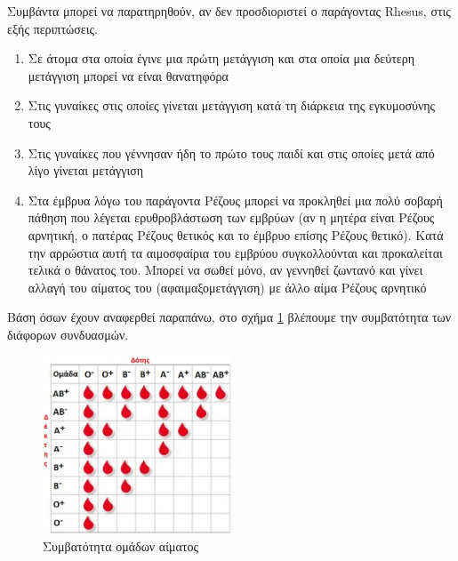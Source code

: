 Συμβάντα μπορεί να παρατηρηθούν, αν δεν προσδιοριστεί ο παράγοντας Rhesus, στις εξής
περιπτώσεις.
\begin{enumerate}
	\item Σε άτομα στα οποία έγινε μια πρώτη μετάγγιση και στα οποία μια δεύτερη μετάγγιση μπορεί να είναι θανατηφόρα
	\item Στις γυναίκες στις οποίες γίνεται μετάγγιση κατά τη διάρκεια της εγκυμοσύνης τους
	\item Στις γυναίκες που γέννησαν ήδη το πρώτο τους παιδί και στις οποίες μετά από λίγο γίνεται μετάγγιση
	\item Στα έμβρυα λόγω του παράγοντα Ρέζους μπορεί να προκληθεί μια πολύ σοβαρή πάθηση που λέγεται ερυθροβλάστωση των εμβρύων (αν η μητέρα είναι Ρέζους αρνητική, ο πατέρας Ρέζους θετικός και το έμβρυο επίσης Ρέζους θετικό). Κατά την αρρώστια αυτή τα αιμοσφαίρια του εμβρύου συγκολλούνται και προκαλείται τελικά ο θάνατος του. Μπορεί να σωθεί μόνο, αν γεννηθεί ζωντανό και γίνει αλλαγή του αίματος του (αφαιμαξομετάγγιση) με άλλο αίμα Ρέζους αρνητικό
\end{enumerate}

Βάση όσων έχουν αναφερθεί παραπάνω, στο σχήμα \ref{fig:blood_compatibility} βλέπουμε την συμβατότητα των διάφορων συνδυασμών.
	\begin{figure}[h!]
	    \centering
	    \includegraphics[width=0.5\textwidth]{blood_compatibility.jpg}
	    \caption{Συμβατότητα ομάδων αίματος}
	    \label{fig:blood_compatibility}
	\end{figure}
	
